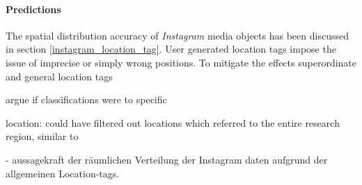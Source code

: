 \paragraph*{Predictions}
The spatial distribution accuracy of \textit{Instagram} media objects has been discussed in section \ref{instagram_location_tag}. User generated location tags impose the issue of imprecise or simply wrong positions. To mitigate the effects superordinate and general location tags 

argue if classifications were to specific 

location: could have filtered out locations which referred to the entire research region, similar to \parencite{Heikinheimo2017}


- aussagekraft der räumlichen Verteilung der Instagram daten aufgrund der allgemeinen Location-tags.


